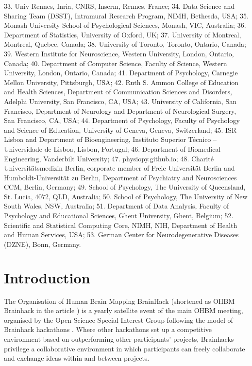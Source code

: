 \documentclass[10pt,a4paper,twocolumns]{proc}
\begin{document}
{33. Univ Rennes, Inria, CNRS, Inserm, Rennes, France; %
34. Data Science and Sharing Team (DSST), Intramural Research Program, NIMH, Bethesda, USA; %
35. Monash University School of Psychological Sciences, Monash, VIC, Australia; %
36. Department of Statistics, University of Oxford, UK; %
37. University of Montreal, Montreal, Quebec, Canada; %
38. University of Toronto, Toronto, Ontario, Canada; %
39. Western Institute for Neuroscience, Western University, London, Ontario, Canada; %
40. Department of Computer Science, Faculty of Science, Western University, London, Ontario, Canada; %
41. Department of Psychology, Carnegie Mellon University, Pittsburgh, USA; %
42. Ruth S. Ammon College of Education and Health Sciences, Department of Communication Sciences and Disorders, Adelphi University, San Francisco, CA, USA; %
43. University of California, San Francisco, Department of Neurology and Department of Neurological Surgery, San Francisco, CA, USA; %
44. Department of Psychology, Faculty of Psychology and Science of Education, University of Geneva, Geneva, Switzerland; %
45. ISR-Lisboa and Department of Bioengineering, Instituto Superior Técnico – Universidade de Lisboa, Lisbon, Portugal; %
46. Department of Biomedical Engineering, Vanderbilt University; %
47. physiopy.github.io; %
48. Charité Universitätsmedizin Berlin, corporate member of Freie Universität Berlin and Humboldt-Universität zu Berlin, Department of Psychiatry and Neurosciences CCM, Berlin, Germany; %
49. School of Psychology, The University of Queensland, St. Lucia, 4072, QLD, Australia; %
50. School of Psychology, The University of New South Wales, NSW, Australia; %
51. Department of Data Analysis, Faculty of Psychology and Educational Sciences, Ghent University, Ghent, Belgium; %
52. Scientific and Statistical Computing Core, NIMH, NIH, Department of Health and Human Services, USA; %
53. German Center for Neurodegenerative Diseases (DZNE), Bonn, Germany.%
}
\\

\section*{Introduction}

The Organisation of Human Brain Mapping BrainHack (shortened as OHBM
Brainhack in the article ) is a yearly satellite event of the main OHBM
meeting, organised by the Open Science Special Interest Group following
the model of Brainhack hackathons \parencite{Gau2021}.
Where other hackathons set up a competitive environment based on
outperforming other participants' projects, Brainhacks privilege a
collaborative environment in which participants can freely collaborate
and exchange ideas within and between projects.
\end{document}
